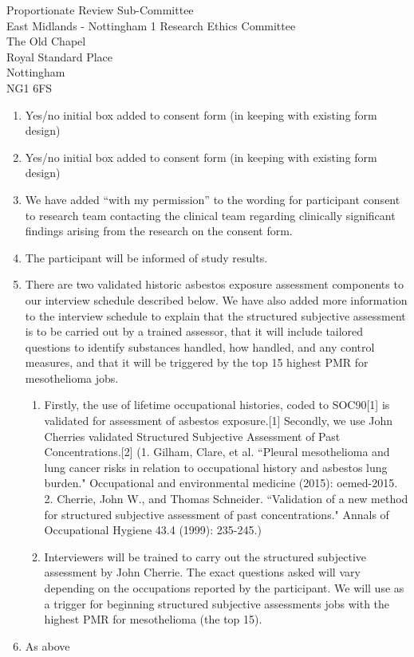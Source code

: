 \documentclass[imperial,letterpaper,pagesize,UScommercial9]{scrlttr2}
\begin{document}
\begin{letter}{    
    Proportionate Review Sub-Committee \\        
    East Midlands - Nottingham 1 Research Ethics Committee \\
    The Old Chapel \\
    Royal Standard Place \\
    Nottingham \\
    NG1 6FS}
\begin{enumerate}[]
\begin{enumerate}[label=(\alph*)]
            \item Patient Liaison and Advisory Services (PALS) contact details are included.
        \end{enumerate}
        \item Yes/no initial box added to consent form (in keeping with existing form design)
        \item Yes/no initial box added to consent form (in keeping with existing form design)
        \item We have added ``with my permission'' to the wording for participant consent to research team contacting the clinical team regarding clinically significant findings arising from the research on the consent form.
        \item The participant will be informed of study results.
        \item There are two validated historic asbestos exposure assessment components to our interview schedule described below. We have also added more information to the interview schedule to explain that the structured subjective assessment is to be carried out by a trained assessor, that it will include tailored questions to identify substances handled, how handled, and any control measures, and that it will be triggered by the top 15 highest PMR for mesothelioma jobs.
            \begin{enumerate}
                \item Firstly, the use of lifetime occupational histories, coded to SOC90[1] is validated for assessment of asbestos exposure.[1] Secondly, we use John Cherries validated Structured Subjective Assessment of Past Concentrations.[2] (1. Gilham, Clare, et al. ``Pleural mesothelioma and lung cancer risks in relation to occupational history and asbestos lung burden." Occupational and environmental medicine
                    (2015): oemed-2015. 2. Cherrie, John W., and Thomas Schneider. ``Validation of a new method for structured subjective assessment of past concentrations." Annals of Occupational Hygiene 43.4 (1999): 235-245.)
                \item Interviewers will be trained to carry out the structured subjective assessment by John Cherrie. The exact questions asked will vary depending on the occupations reported by the participant. We will use as a trigger for beginning structured subjective assessments jobs with the highest PMR for mesothelioma (the top 15).
            \end{enumerate}
        \item As above

\end{enumerate}
\end{letter}
\end{document}

